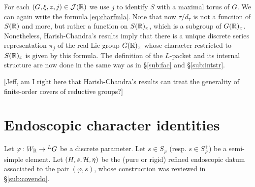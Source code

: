 \documentclass{article}
\theoremstyle{definition}
\numberwithin{equation}{section}
\renewcommand{\-}{\hyp{}}
\newcommand{\warn}[1]{{\leavevmode\color{red}[#1]}}
\begin{document}
For each $(G,\xi,z,j) \in \mathcal{J}(\mathbb{R})$ we use $j$ to identify $S$ with a maximal torus of $G$. We can again write the formula \eqref{eq:charfmla}. Note that now $\tau/d_\tau$ is not a function of $S(\mathbb{R})$ and more, but rather a function on $S(\mathbb{R})_x$, which is a subgroup of $G(\mathbb{R})_x$. Nonetheless, Harish-Chandra's results imply that there is a unique discrete series representation $\pi_j$ of the real Lie group $G(\mathbb{R})_x$ whose character restricted to $S(\mathbb{R})_x$ is given by this formula. The definition of the $L$-packet and its internal structure are now done in the same way as in \S\ref{sub:fac} and \S\ref{sub:intstr}.

\warn{Jeff, am I right here that Harish-Chandra's results can treat the generality of finite-order covers of reductive groups?}


\section{Endoscopic character identities} \label{sec:endo}

Let $\varphi : W_{\mathbb{R}} \to {^LG}$ be a discrete parameter. Let $s \in S_\varphi$ (resp. $s \in S_\varphi^+$) be a semi-simple element. Let $(H,s,\mathcal{H},\eta)$ be the (pure or rigid) refined endoscopic datum associated to the pair $(\varphi,s)$, whose construction was reviewed in \S\ref{sub:covendo}.




\end{document}
